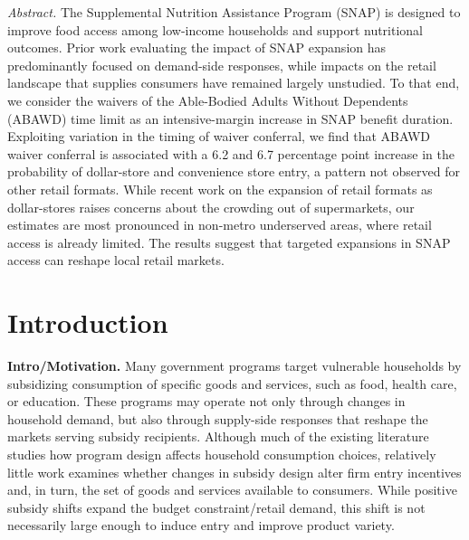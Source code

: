 \documentclass[12pt]{article}
\begin{document}
\textit{Abstract.} The Supplemental Nutrition Assistance Program (SNAP) is designed to improve food access among low-income households and support nutritional outcomes. Prior work evaluating the impact of SNAP expansion has predominantly focused on demand-side responses, while impacts on the retail landscape that supplies consumers have remained largely unstudied. To that end, we consider the waivers of the Able-Bodied Adults Without Dependents (ABAWD) time limit as an intensive-margin increase in SNAP benefit duration. Exploiting variation in the timing of waiver conferral, we find that ABAWD waiver conferral is associated with a 6.2  and 6.7 percentage point increase in the probability of dollar-store and convenience store entry, a pattern not observed for other retail formats. While recent work on the expansion of retail formats as dollar-stores raises concerns about the crowding out of supermarkets, our estimates are most pronounced in non-metro underserved areas, where retail access is already limited. The results suggest that targeted expansions in SNAP access can reshape local retail markets.

\newpage
\section{Introduction}

\textbf{Intro/Motivation.} Many government programs target vulnerable households by subsidizing consumption of specific goods and services, such as food, health care, or education. These programs may operate not only through changes in household demand, but also through supply-side responses that reshape the markets serving subsidy recipients. Although much of the existing literature studies how program design affects household consumption choices, relatively little work examines whether changes in subsidy design alter firm entry incentives and, in turn, the set of goods and services available to consumers. While positive subsidy shifts expand the budget constraint/retail demand, this shift is not necessarily large enough to induce entry and improve product variety. 
\end{document}
